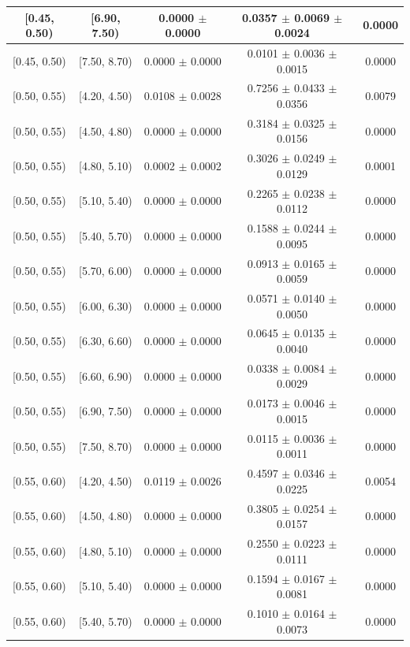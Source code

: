\begin{longtable}{|c|c|c|c|c|}
\hline
[0.45, 0.50) & [6.90, 7.50) & 0.0000 $\pm$ 0.0000 & 0.0357 $\pm$ 0.0069 $\pm$ 0.0024 & 0.0000 \\ 
\hline
[0.45, 0.50) & [7.50, 8.70) & 0.0000 $\pm$ 0.0000 & 0.0101 $\pm$ 0.0036 $\pm$ 0.0015 & 0.0000 \\ 
\hline
[0.50, 0.55) & [4.20, 4.50) & 0.0108 $\pm$ 0.0028 & 0.7256 $\pm$ 0.0433 $\pm$ 0.0356 & 0.0079 \\ 
\hline
[0.50, 0.55) & [4.50, 4.80) & 0.0000 $\pm$ 0.0000 & 0.3184 $\pm$ 0.0325 $\pm$ 0.0156 & 0.0000 \\ 
\hline
[0.50, 0.55) & [4.80, 5.10) & 0.0002 $\pm$ 0.0002 & 0.3026 $\pm$ 0.0249 $\pm$ 0.0129 & 0.0001 \\ 
\hline
[0.50, 0.55) & [5.10, 5.40) & 0.0000 $\pm$ 0.0000 & 0.2265 $\pm$ 0.0238 $\pm$ 0.0112 & 0.0000 \\ 
\hline
[0.50, 0.55) & [5.40, 5.70) & 0.0000 $\pm$ 0.0000 & 0.1588 $\pm$ 0.0244 $\pm$ 0.0095 & 0.0000 \\ 
\hline
[0.50, 0.55) & [5.70, 6.00) & 0.0000 $\pm$ 0.0000 & 0.0913 $\pm$ 0.0165 $\pm$ 0.0059 & 0.0000 \\ 
\hline
[0.50, 0.55) & [6.00, 6.30) & 0.0000 $\pm$ 0.0000 & 0.0571 $\pm$ 0.0140 $\pm$ 0.0050 & 0.0000 \\ 
\hline
[0.50, 0.55) & [6.30, 6.60) & 0.0000 $\pm$ 0.0000 & 0.0645 $\pm$ 0.0135 $\pm$ 0.0040 & 0.0000 \\ 
\hline
[0.50, 0.55) & [6.60, 6.90) & 0.0000 $\pm$ 0.0000 & 0.0338 $\pm$ 0.0084 $\pm$ 0.0029 & 0.0000 \\ 
\hline
[0.50, 0.55) & [6.90, 7.50) & 0.0000 $\pm$ 0.0000 & 0.0173 $\pm$ 0.0046 $\pm$ 0.0015 & 0.0000 \\ 
\hline
[0.50, 0.55) & [7.50, 8.70) & 0.0000 $\pm$ 0.0000 & 0.0115 $\pm$ 0.0036 $\pm$ 0.0011 & 0.0000 \\ 
\hline
[0.55, 0.60) & [4.20, 4.50) & 0.0119 $\pm$ 0.0026 & 0.4597 $\pm$ 0.0346 $\pm$ 0.0225 & 0.0054 \\ 
\hline
[0.55, 0.60) & [4.50, 4.80) & 0.0000 $\pm$ 0.0000 & 0.3805 $\pm$ 0.0254 $\pm$ 0.0157 & 0.0000 \\ 
\hline
[0.55, 0.60) & [4.80, 5.10) & 0.0000 $\pm$ 0.0000 & 0.2550 $\pm$ 0.0223 $\pm$ 0.0111 & 0.0000 \\ 
\hline
[0.55, 0.60) & [5.10, 5.40) & 0.0000 $\pm$ 0.0000 & 0.1594 $\pm$ 0.0167 $\pm$ 0.0081 & 0.0000 \\ 
\hline
[0.55, 0.60) & [5.40, 5.70) & 0.0000 $\pm$ 0.0000 & 0.1010 $\pm$ 0.0164 $\pm$ 0.0073 & 0.0000 \\ 

\end{longtable}

